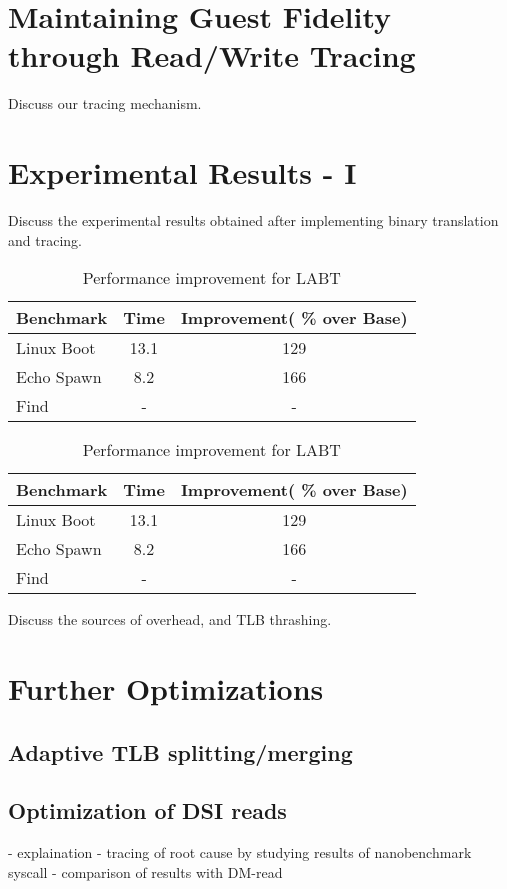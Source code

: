 \documentclass[10pt,twocolumn]{article}
\begin{document}
\section{Maintaining Guest Fidelity through Read/Write Tracing}
Discuss our tracing mechanism.

\section{Experimental Results - I}
Discuss the experimental results obtained after implementing binary translation
and tracing. 
\begin{table}[!b]
\centering
\caption{Performance improvement for LABT}
     \begin{tabular}{lcc} \hline
       Benchmark  & Time & Improvement( \% over Base)  \\ \hline
       Linux Boot & 13.1 & 129  \\
       Echo Spawn & 8.2 & 166  \\
       Find & - & -  \\
       \hline
     \end{tabular}
\label{tab:ExpWithout1}
\end{table}

\begin{table}[!b]
\centering
\caption{Performance improvement for LABT}
     \begin{tabular}{lcc} \hline
       Benchmark  & Time & Improvement( \% over Base)  \\ \hline
       Linux Boot & 13.1 & 129  \\
       Echo Spawn & 8.2 & 166  \\
       Find & - & -  \\
       \hline
     \end{tabular}
\label{tab:ExpWithout2}
\end{table}


Discuss the sources of overhead, and TLB thrashing.

\section{Further Optimizations}
\subsection{Adaptive TLB splitting/merging}
\subsection{Optimization of DSI reads} - explaination - tracing of root cause by studying results of nanobenchmark syscall - comparison of results with DM-read
\end{document}
